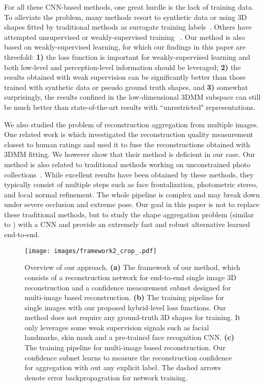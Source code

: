 \documentclass[10pt,twocolumn,letterpaper]{article}
\begin{document}
For all these CNN-based methods, one great hurdle is the lack of training data. To alleviate the problem, many methods resort to synthetic data or using 3D shapes fitted by traditional methods as surrogate training labels~\cite{richardson20163d,zhu2016face,sela2017unrestricted,liu2018disentangling,feng2018joint,guo2018cnn}. Others have attempted unsupervised or weakly-supervised training ~\cite{tewari2017mofa,tewari2018self,tran2018nonlinear,sengupta2018sfsnet,genova2018unsupervised}. Our method is also based on weakly-supervised learning, for which our findings in this paper are threefold: {\textbf{1)}} the loss function is important for weakly-supervised learning and both low-level and perception-level information should be leveraged; {\textbf{2)}} the results obtained with weak supervision can be significantly better than those trained with synthetic data or pseudo ground truth shapes, and {\textbf{3)}} somewhat surprisingly, the results confined in the low-dimensional 3DMM subspace can still be much better than state-of-the-art results with ``unrestricted" representations.

We also studied the problem of reconstruction aggregation from multiple images. One related work is \cite{piotraschke2016automated} which investigated the reconstruction quality measurement closest to human ratings and used it to fuse the reconstructions obtained with 3DMM fitting. We however show that their method is deficient in our case.
Our method is also related to traditional methods working on unconstrained photo collections~\cite{kemelmacher2011face,suwajanakorn2014total,roth2015unconstrained,roth2016adaptive}.
While excellent results have been obtained by these methods, they typically consist of multiple steps such as face frontalization, photometric stereo, and local normal refinement. The whole pipeline is complex and may break down under severe occlusion and extreme pose.
Our goal in this paper is not to replace these traditional methods, but to study the shape aggregation problem (similar to \cite{piotraschke2016automated}) with a CNN and 
provide an extremely fast and robust alternative learned end-to-end.



\begin{figure*}[t!]
	\vspace{-3pt}
	\centering
	\texttt{[image: images/framework2\_crop\_.pdf]}
	\caption{Overview of our approach. \textbf{(a)} The framework of our method, which consists of a reconstruction network for end-to-end single image 3D reconstruction and a confidence measurement subnet designed for multi-image based reconstruction. \textbf{(b)} The training pipeline for single images with our proposed hybrid-level loss functions. Our method does not require any ground-truth 3D shapes for training. It only leverages some weak supervision signals such as facial landmarks, skin mask and a pre-trained face recognition CNN. \textbf{(c)} The training pipeline for multi-image based reconstruction. Our confidence subnet learns to measure the reconstruction confidence for aggregation with out any explicit label. The dashed arrows denote error backpropagration for network training.}\label{fig:overview}
\end{figure*}
\end{document}
